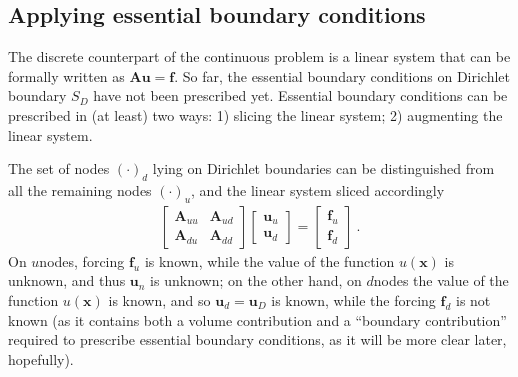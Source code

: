 \documentclass[letterpaper,10pt,english]{jupyterBook}
\begin{document}
\subsection{Applying essential boundary conditions}
\label{\detokenize{ch/pde/fvm-poisson-1d:applying-essential-boundary-conditions}}
\sphinxAtStartPar
The discrete counterpart of the continuous problem is a linear system that can be formally written as \(\mathbf{A} \mathbf{u} = \mathbf{f}\). So far, the essential boundary conditions on Dirichlet boundary \(S_D\) have not been prescribed yet. Essential boundary conditions can be prescribed in (at least) two ways: 1) slicing the linear system; 2) augmenting the linear system.

\sphinxAtStartPar
{} The set of nodes \((\cdot)_d\) lying on Dirichlet boundaries can be distinguished from all the remaining nodes \((\cdot)_u\), and the linear system sliced accordingly
\begin{equation*}
\begin{split}\begin{bmatrix} \mathbf{A}_{uu} &  \mathbf{A}_{ud} \\ \mathbf{A}_{du} & \mathbf{A}_{dd} \end{bmatrix} \begin{bmatrix} \mathbf{u}_u \\ \mathbf{u}_d \end{bmatrix} = \begin{bmatrix} \mathbf{f}_u \\ \mathbf{f}_d \end{bmatrix} \ .\end{split}
\end{equation*}
\sphinxAtStartPar
On \(u\)\sphinxhyphen{}nodes, forcing \(\mathbf{f}_u\) is known, while the value of the function \(u(\mathbf{x})\) is unknown, and thus \(\mathbf{u}_n\) is unknown; on the other hand, on \(d\)\sphinxhyphen{}nodes the value of the function \(u(\mathbf{x})\) is known, and so \(\mathbf{u}_d = \mathbf{u}_D\) is known, while the forcing \(\mathbf{f}_d\) is not known (as it contains both a volume contribution and a “boundary contribution” required to prescribe essential boundary conditions, as it will be more clear later, hopefully).
\end{document}

